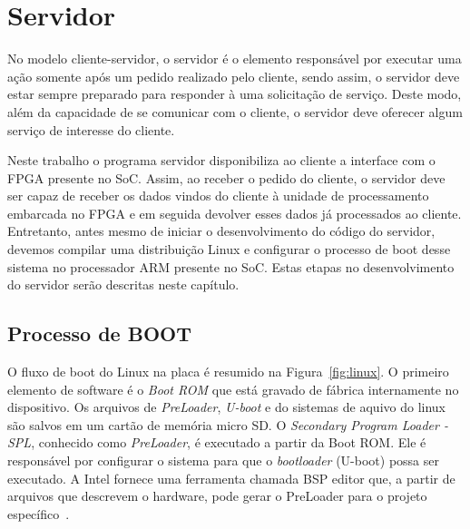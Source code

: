 \chapter{Servidor}\label{cap:server}

No modelo cliente-servidor, o servidor é o elemento responsável por executar uma ação somente após um pedido realizado pelo cliente, sendo assim, o servidor deve estar sempre preparado para responder à uma solicitação de serviço. Deste modo, além da capacidade de se comunicar com o cliente, o servidor deve oferecer algum serviço de interesse do cliente. 

Neste trabalho o programa servidor disponibiliza ao cliente a interface com o FPGA presente no SoC. Assim, ao receber o pedido do cliente, o servidor deve ser capaz de receber os dados vindos do cliente à unidade de processamento embarcada no FPGA e em seguida devolver esses dados já processados ao cliente. Entretanto, antes mesmo de iniciar o desenvolvimento do código do servidor, devemos compilar uma distribuição Linux e configurar o processo de boot desse sistema no processador ARM presente no SoC. Estas etapas no desenvolvimento do servidor serão descritas neste capítulo.

\section{Processo de BOOT}
O fluxo de boot do Linux na placa é resumido na Figura~\ref{fig:linux}. O primeiro elemento de software é o \textit{Boot ROM} que está gravado de fábrica internamente no dispositivo. Os arquivos de \textit{PreLoader},\textit{ U-boot} e do sistemas de aquivo do linux são salvos em um cartão de memória micro SD\@. O \textit{Secondary Program Loader - SPL}, conhecido como \textit{PreLoader}, é executado a partir da Boot ROM\@. Ele é responsável por configurar o sistema para que o \textit{bootloader} (U-boot) possa ser executado. A Intel fornece uma ferramenta chamada BSP editor que, a partir de arquivos que descrevem o hardware, pode gerar o PreLoader para o projeto específico~\cite{SocLinux}.  

